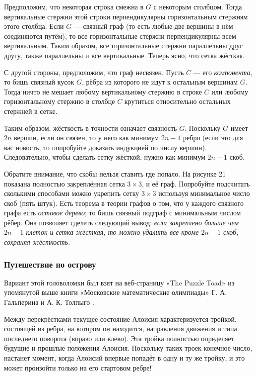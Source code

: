 Предположим, что некоторая строка смежна в $G$ с некоторым столбцом.
Тогда вертикальные стержни этой строки перпендикулярны горизонтальным стержням этого столбца.
Если $G$ --- связный граф (то есть любые две вершины в нём соединяются путём), то все горизонтальные стержни перпендикулярны всем вертикальным.
Таким образом, все горизонтальные стержни параллельны друг другу,
также параллельны и все вертикальные.
Теперь ясно, что сетка жёсткая.

С другой стороны, предположим, что граф несвязен.
Пусть $C$ --- его \emph{компонента}, то бишь связный кусок $G$, рёбра из которого не идут к остальным вершинам $G$.
Тогда ничто не мешает любому вертикальному стержню в строке $C$ или любому горизонтальному стержню в столбце $C$ крутиться относительно остальных стержней в сетке.

Таким образом, жёсткость в точности означает связность $G$.
Поскольку $G$ имеет $2n$ вершин, если он связен, то у него как минимум $2n - 1$ ребро
(если это для вас новость, то попробуйте доказать индукцией по числу вершин).
Следовательно, чтобы сделать сетку жёсткой, нужно как минимум $2n - 1$ скоб.

Обратите внимание, что скобы нельзя ставить где попало.
На рисунке 21 показана полностью закреплённая сетка $3 \times 3$, и её граф.
Попробуйте подсчитать сколькими способами можно укрепить сетку $3 \times 3$ используя минимальное число скоб  (пять штук).
Есть теорема в теории графов о том, что у каждого связного графа есть \emph{остовое дерево}; то бишь связный подграф с минимальным числом рёбер.
Она позволяет сделать следующий вывод: \emph{если закреплено больше чем $2n - 1$ клеток и сетка жёсткая, то можно удалить все кроме $2n - 1$ скоб, сохраняя жёсткость.}

\subsubsection*{Путешествие по острову}

Вариант этой головоломки был взят на веб-страницу «The Puzzle Toad» \cite{bohman-pikhurko-frieze-sleator} из упомянутой выше книги «Московские математические олимпиады» Г. А. Гальперина и А. К. Толпыго \cite{23}.

Между перекрёстками текущее состояние Алоисия характеризуется тройкой, состоящей из ребра, на котором он находится, направления движения и типа последнего поворота (вправо или влево).
Эта тройка полностью определяет будущие и прошлые положения Алоисия.
Поскольку таких троек конечное число, настанет момент, когда Алоисий впервые попадёт в одну и ту же тройку, и это может произойти только на его стартовом ребре!

